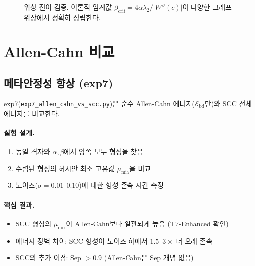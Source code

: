 \begin{figure}[t]
\centering
{}
\caption{위상 전이 검증. 이론적 임계값 $\beta_{\mathrm{crit}} = 4\alpha\lambda_2/|W''(c)|$이 다양한 그래프 위상에서 정확히 성립한다.}
\label{fig:phase-transition}
\end{figure}


\section{Allen-Cahn 비교}
\label{sec:exp-allen-cahn}

\subsection{메타안정성 향상 (exp7)}

exp7(\texttt{exp7\_allen\_cahn\_vs\_scc.py})은 순수 Allen-Cahn 에너지($\mathcal{E}_{\mathrm{bd}}$만)와 SCC 전체 에너지를 비교한다.

\paragraph{실험 설계.}
\begin{enumerate}
    \item 동일 격자와 $\alpha, \beta$에서 양쪽 모두 형성을 찾음
    \item 수렴된 형성의 헤시안 최소 고유값 $\mu_{\min}$을 비교
    \item 노이즈($\sigma = 0.01$--$0.10$)에 대한 형성 존속 시간 측정
\end{enumerate}

\paragraph{핵심 결과.}
\begin{itemize}
    \item SCC 형성의 $\mu_{\min}$이 Allen-Cahn보다 일관되게 높음 (T7-Enhanced 확인)
    \item 에너지 장벽 차이: SCC 형성이 노이즈 하에서 $1.5$--$3\times$ 더 오래 존속
    \item SCC의 추가 이점: Sep $> 0.9$ (Allen-Cahn은 Sep 개념 없음)
\end{itemize}

